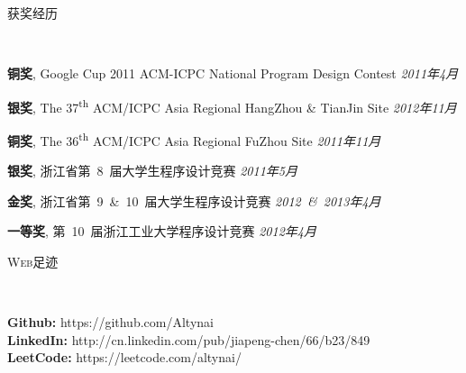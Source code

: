 ﻿\documentclass[9pt]{article}
\newenvironment{changemargin}[2]{%
  \begin{list}{}{%
    \setlength{\topsep}{0pt}%
    \setlength{\leftmargin}{#1}%
    \setlength{\rightmargin}{#2}%
    \setlength{\listparindent}{\parindent}%
    \setlength{\itemindent}{\parindent}%
    \setlength{\parsep}{\parskip}%
  }%
  \item[]}{\end{list}
}
\newcommand{\lineover}{
	\begin{changemargin}{-0.05in}{-0.05in}
		\vspace*{-8pt}
		\hrulefill \\
		\vspace*{-2pt}
	\end{changemargin}
}
\newcommand{\header}[1]{
	\begin{changemargin}{-0.5in}{-0.5in}
		\scshape{#1}\\
  	\lineover
	\end{changemargin}
}
\newenvironment{body} {
	\vspace*{-16pt}
	\begin{changemargin}{-0.25in}{-0.5in}
  }	
	{\end{changemargin}
}
\newcommand\nth{\textsuperscript{th}} %
\begin{document}
\smallskip

\header{获奖经历}

\begin{body}
	\vspace{14pt}

	\textbf{铜奖}, Google Cup 2011 ACM-ICPC National Program Design Contest \hfill{} \emph{2011年4月}\\
	\smallskip

	\textbf{银奖}, The 37\nth{} ACM/ICPC Asia Regional HangZhou \& TianJin Site \hfill{} \emph{2012年11月}\\
	\smallskip

	\textbf{铜奖}, The 36\nth{} ACM/ICPC Asia Regional FuZhou Site \hfill{} \emph{2011年11月}\\
	\smallskip

	\textbf{银奖}, 浙江省第~8~届大学生程序设计竞赛 \hfill{} \emph{2011年5月}\\
	\smallskip

	\textbf{金奖}, 浙江省第~9~\&~10~届大学生程序设计竞赛 \hfill{} \emph{2012~\&~2013年4月}\\
	\smallskip

	\textbf{一等奖}, 第~10~届浙江工业大学程序设计竞赛 \hfill{} \emph{2012年4月}\\
\end{body}

\smallskip

\header{Web足迹}

\begin{body}
	\vspace{14pt}
    \textbf{Github:} https://github.com/Altynai \\
    \textbf{LinkedIn:} http://cn.linkedin.com/pub/jiapeng-chen/66/b23/849\\
    \textbf{LeetCode:} https://leetcode.com/altynai/ \\
\end{body}
\end{document}
